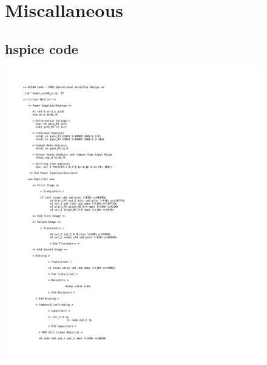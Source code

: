 \documentclass[]{article}
\begin{document}
			\begin{figure}
				\section{Miscallaneous}
					\subsection{hspice code}
						\includegraphics[width=1.3\textwidth]{code.pdf}
			\end{figure}
			
\end{document}
